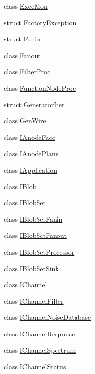 \begin{DoxyCompactItemize}
class \hyperlink{class_wire_cell_1_1_exec_mon}{Exec\+Mon}
\item 
struct \hyperlink{struct_wire_cell_1_1_factory_exception}{Factory\+Exception}
\item 
struct \hyperlink{struct_wire_cell_1_1_fanin}{Fanin}
\item 
class \hyperlink{class_wire_cell_1_1_fanout}{Fanout}
\item 
class \hyperlink{class_wire_cell_1_1_filter_proc}{Filter\+Proc}
\item 
class \hyperlink{class_wire_cell_1_1_function_node_proc}{Function\+Node\+Proc}
\item 
struct \hyperlink{struct_wire_cell_1_1_generator_iter}{Generator\+Iter}
\item 
class \hyperlink{class_wire_cell_1_1_gen_wire}{Gen\+Wire}
\item 
class \hyperlink{class_wire_cell_1_1_i_anode_face}{I\+Anode\+Face}
\item 
class \hyperlink{class_wire_cell_1_1_i_anode_plane}{I\+Anode\+Plane}
\item 
class \hyperlink{class_wire_cell_1_1_i_application}{I\+Application}
\item 
class \hyperlink{class_wire_cell_1_1_i_blob}{I\+Blob}
\item 
class \hyperlink{class_wire_cell_1_1_i_blob_set}{I\+Blob\+Set}
\item 
class \hyperlink{class_wire_cell_1_1_i_blob_set_fanin}{I\+Blob\+Set\+Fanin}
\item 
class \hyperlink{class_wire_cell_1_1_i_blob_set_fanout}{I\+Blob\+Set\+Fanout}
\item 
class \hyperlink{class_wire_cell_1_1_i_blob_set_processor}{I\+Blob\+Set\+Processor}
\item 
class \hyperlink{class_wire_cell_1_1_i_blob_set_sink}{I\+Blob\+Set\+Sink}
\item 
class \hyperlink{class_wire_cell_1_1_i_channel}{I\+Channel}
\item 
class \hyperlink{class_wire_cell_1_1_i_channel_filter}{I\+Channel\+Filter}
\item 
class \hyperlink{class_wire_cell_1_1_i_channel_noise_database}{I\+Channel\+Noise\+Database}
\item 
class \hyperlink{class_wire_cell_1_1_i_channel_response}{I\+Channel\+Response}
\item 
class \hyperlink{class_wire_cell_1_1_i_channel_spectrum}{I\+Channel\+Spectrum}
\item 
class \hyperlink{class_wire_cell_1_1_i_channel_status}{I\+Channel\+Status}

\end{DoxyCompactItemize}
